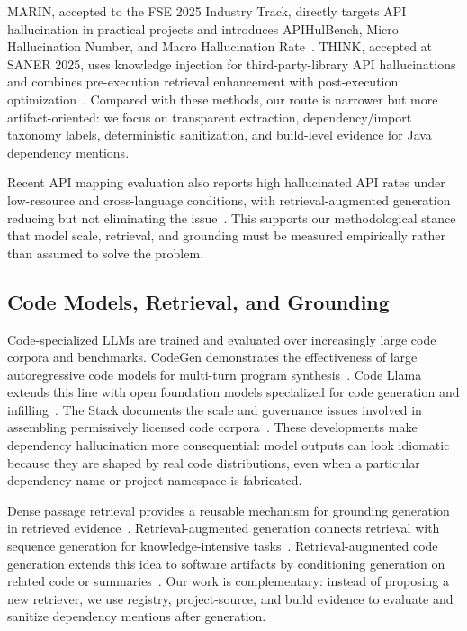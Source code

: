 \documentclass[pdflatex,sn-basic]{sn-jnl}
\begin{document}
MARIN, accepted to the FSE 2025 Industry Track, directly targets API hallucination in practical projects and introduces APIHulBench, Micro Hallucination Number, and Macro Hallucination Rate~\citep{Chen2025MARIN}. THINK, accepted at SANER 2025, uses knowledge injection for third-party-library API hallucinations and combines pre-execution retrieval enhancement with post-execution optimization~\citep{Liu2025THINK}. Compared with these methods, our route is narrower but more artifact-oriented: we focus on transparent extraction, dependency/import taxonomy labels, deterministic sanitization, and build-level evidence for Java dependency mentions.

Recent API mapping evaluation also reports high hallucinated API rates under low-resource and cross-language conditions, with retrieval-augmented generation reducing but not eliminating the issue~\citep{Han2026APIMapping}. This supports our methodological stance that model scale, retrieval, and grounding must be measured empirically rather than assumed to solve the problem.

\subsection{Code Models, Retrieval, and Grounding}

Code-specialized LLMs are trained and evaluated over increasingly large code corpora and benchmarks. CodeGen demonstrates the effectiveness of large autoregressive code models for multi-turn program synthesis~\citep{Nijkamp2023CodeGen}. Code Llama extends this line with open foundation models specialized for code generation and infilling~\citep{Roziere2024CodeLlama}. The Stack documents the scale and governance issues involved in assembling permissively licensed code corpora~\citep{Kocetkov2023Stack}. These developments make dependency hallucination more consequential: model outputs can look idiomatic because they are shaped by real code distributions, even when a particular dependency name or project namespace is fabricated.

Dense passage retrieval provides a reusable mechanism for grounding generation in retrieved evidence~\citep{Karpukhin2020DPR}. Retrieval-augmented generation connects retrieval with sequence generation for knowledge-intensive tasks~\citep{Lewis2020RAG}. Retrieval-augmented code generation extends this idea to software artifacts by conditioning generation on related code or summaries~\citep{Parvez2021RetrievalCode}. Our work is complementary: instead of proposing a new retriever, we use registry, project-source, and build evidence to evaluate and sanitize dependency mentions after generation.
\end{document}
